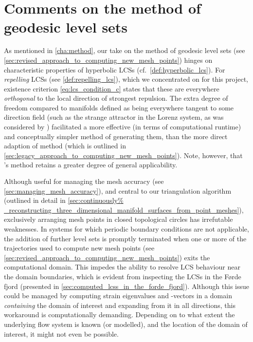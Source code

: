 \section{Comments on the method of geodesic level sets}
\label{sec:comments_on_the_method_of_geodesic_level_sets}

As mentioned in \cref{cha:method}, our take on the method of geodesic level
sets (see \cref{sec:revised_approach_to_computing_new_mesh_points}) hinges on
characteristic properties of hyperbolic LCSs (cf.\ \cref{def:hyperbolic_lcs}).
For \emph{repelling} LCSs (see \cref{def:repelling_lcs}), which we concentrated
on for this project, existence criterion \cref{eq:lcs_condition_c} states that
these are everywhere \emph{orthogonal} to the local direction of strongest
repulsion. The extra degree of freedom compared to manifolds defined as being
everywhere tangent to some direction field (such as the strange attractor in
the Lorenz system, as was considered by \textcite{krauskopf2005survey})
facilitated a more effective (in terms of computational runtime) and
conceptually simpler method of generating them, than the more direct adaption
of  method (which is outlined in
\cref{sec:legacy_approach_to_computing_new_mesh_points}). Note, however, that
\citeauthor{krauskopf2005survey}'s method retains a greater degree of
general applicability.

Although useful for managing the mesh accuracy (see
\cref{sec:managing_mesh_accuracy}), and central to our
triangulation algorithm (outlined in detail in \cref{sec:continuously%
_reconstructing_three_dimensional_manifold_surfaces_from_point_meshes}),
exclusively arranging mesh points in closed topological circles has irrefutable
weaknesses. In systems for which periodic boundary conditions are not
applicable, the addition of further level sets is promptly terminated when one
or more of the trajectories used to compute new mesh points (see
\cref{sec:revised_approach_to_computing_new_mesh_points}) exits the
computational domain. This impedes the ability to resolve LCS behaviour near
the domain boundaries, which is evident from inspecting the LCSs in the Førde
fjord (presented in \cref{sec:computed_lcss_in_the_forde_fjord}). Although this
issue could be managed by computing strain eigenvalues and -vectors in a domain
\emph{containing} the domain of interest and expanding from it in all
directions, this workaround is computationally demanding. Depending on to what
extent the underlying flow system is known (or modelled), and the location of
the domain of interest, it might not even be possible.

